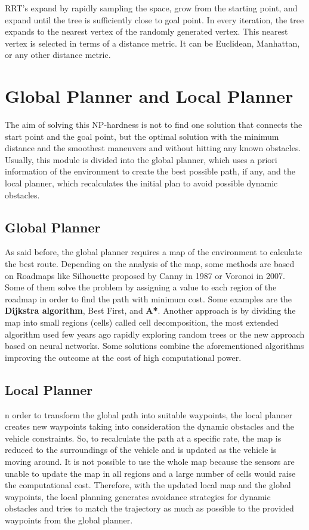 \documentclass[11pt]{article}
\begin{document}
RRT’s expand by rapidly sampling the space, grow from the starting point, and expand
until the tree is sufficiently close to goal point. In every iteration, the tree expands to the
nearest vertex of the randomly generated vertex. This nearest vertex is selected in terms of
a distance metric. It can be Euclidean, Manhattan, or any other distance metric.\pagebreak

\section{Global Planner and Local Planner}
The aim of solving this NP-hardness is not to find one solution that connects the start point and the goal point, but the optimal solution with the minimum distance and the smoothest maneuvers and without hitting any known obstacles. Usually, this module is divided into the global planner, which uses a priori information of the environment to create the best possible path, if any, and the local planner, which recalculates the initial plan to avoid possible dynamic obstacles.

\subsection{Global Planner}
As said before, the global planner requires a map of the environment to calculate the best route. Depending on the analysis of the map, some methods are based on Roadmaps like Silhouette proposed by Canny in 1987 or Voronoi in 2007. Some of them solve the problem by assigning a value to each region of the roadmap in order to find the path with minimum cost. Some examples are the \textbf{Dijkstra algorithm}, Best First, and \textbf{A*}. Another approach is by dividing the map into small regions (cells) called cell decomposition, the most extended algorithm used few years ago rapidly exploring random trees or the new approach based on neural networks. Some solutions combine the aforementioned algorithms improving the outcome at the cost of high computational power.
\subsection{Local Planner}
n order to transform the global path into suitable waypoints, the local planner creates new waypoints taking into consideration the dynamic obstacles and the vehicle constraints. So, to recalculate the path at a specific rate, the map is reduced to the surroundings of the vehicle and is updated as the vehicle is moving around. It is not possible to use the whole map because the sensors are unable to update the map in all regions and a large number of cells would raise the computational cost. Therefore, with the updated local map and the global waypoints, the local planning generates avoidance strategies for dynamic obstacles and tries to match the trajectory as much as possible to the provided waypoints from the global planner.
\end{document}
